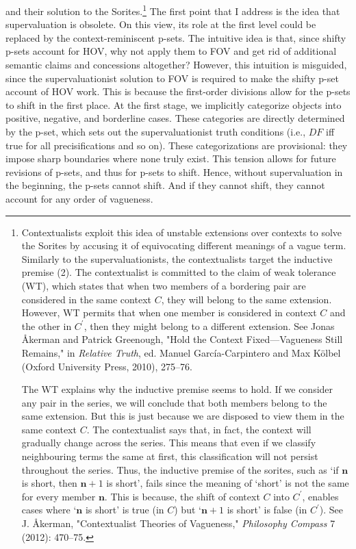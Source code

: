 and their solution to the Sorites.\footnote{Contextualists exploit this
  idea of unstable extensions over contexts to solve the Sorites by
  accusing it of equivocating different meanings of a vague term.
  Similarly to the supervaluationists, the contextualists target the
  inductive premise (2). The contextualist is committed to the claim of
  weak tolerance (WT), which states that when two members of a bordering
  pair are considered in the same context $C$, they will belong to the
  same extension. However, WT permits that when one member is considered
  in context $C$ and the other in $C^\prime$, then they might belong to a
  different extension. See Jonas Åkerman and Patrick Greenough, "Hold
  the Context Fixed---Vagueness Still Remains," in \textit{Relative
  Truth}, ed. Manuel García-Carpintero and Max Kölbel (Oxford University
  Press, 2010), 275--76.

  The WT explains why the inductive premise seems to hold. If we
  consider any pair in the series, we will conclude that both members
  belong to the same extension. But this is just because we are disposed
  to view them in the same context $C$. The contextualist says that, in
  fact, the context will gradually change across the series. This means
  that even if we classify neighbouring terms the same at first, this
  classification will not persist throughout the series. Thus, the
  inductive premise of the sorites, such as `if $\mathbf{n}$ is short, then $\mathbf{n}+1$ is short', fails since the meaning of `short' is not the same for every
  member $\mathbf{n}$. This is because, the shift of context $C$ into $C^\prime$,
  enables cases where `$\mathbf{n}$ is short' is true (in $C$) but `$\mathbf{n}+1$ is short' is false (in $C^\prime$). See J. Åkerman, "Contextualist Theories of Vagueness,"
  \textit{Philosophy Compass} 7 (2012): 470--75.}
The first point that I address is the idea that supervaluation is
obsolete. On this view, its role at the first level could be replaced by
the context-reminiscent p-sets. The intuitive idea is that, since shifty
p-sets account for HOV, why not apply them to FOV and get rid of
additional semantic claims and concessions altogether? However, this
intuition is misguided, since the supervaluationist solution to FOV is
required to make the shifty p-set account of HOV work. This is because
the first-order divisions allow for the p-sets to shift in the first
place. At the first stage, we implicitly categorize objects into
positive, negative, and borderline cases. These categories are directly
determined by the p-set, which sets out the supervaluationist truth
conditions (i.e., $DF$ iff true for all precisifications and so on). These
categorizations are provisional: they impose sharp boundaries where none
truly exist. This tension allows for future revisions of p-sets, and
thus for p-sets to shift. Hence, without supervaluation in the
beginning, the p-sets cannot shift. And if they cannot shift, they
cannot account for any order of vagueness.

